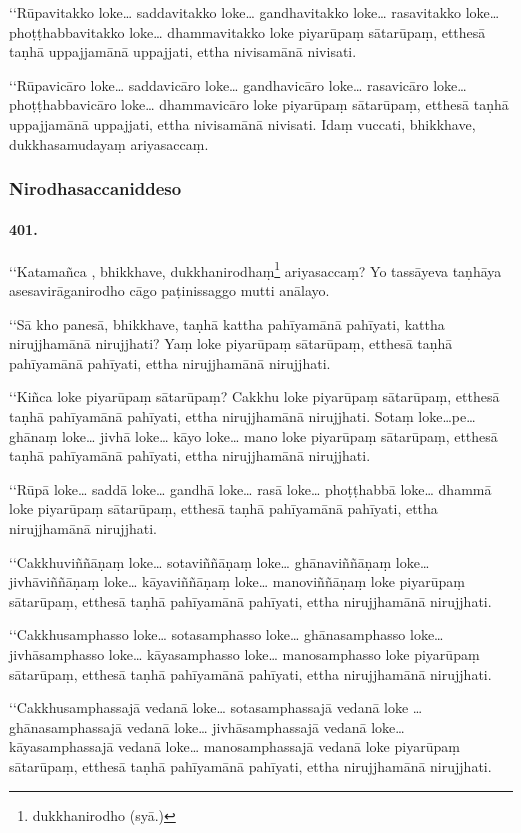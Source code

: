 ‘‘Rūpavitakko loke… saddavitakko loke… gandhavitakko loke… rasavitakko loke… phoṭṭhabbavitakko loke… dhammavitakko loke piyarūpaṃ sātarūpaṃ, etthesā taṇhā uppajjamānā uppajjati, ettha nivisamānā nivisati.

‘‘Rūpavicāro loke… saddavicāro loke… gandhavicāro loke… rasavicāro loke… phoṭṭhabbavicāro loke… dhammavicāro loke piyarūpaṃ sātarūpaṃ, etthesā taṇhā uppajjamānā uppajjati, ettha nivisamānā nivisati. Idaṃ vuccati, bhikkhave, dukkhasamudayaṃ ariyasaccaṃ.

\subsubsection{Nirodhasaccaniddeso}

\paragraph{401.} ‘‘Katamañca , bhikkhave, dukkhanirodhaṃ\footnote{dukkhanirodho (syā.)} ariyasaccaṃ? Yo tassāyeva taṇhāya asesavirāganirodho cāgo paṭinissaggo mutti anālayo.

‘‘Sā kho panesā, bhikkhave, taṇhā kattha pahīyamānā pahīyati, kattha nirujjhamānā nirujjhati? Yaṃ loke piyarūpaṃ sātarūpaṃ, etthesā taṇhā pahīyamānā pahīyati, ettha nirujjhamānā nirujjhati.

‘‘Kiñca loke piyarūpaṃ sātarūpaṃ? Cakkhu loke piyarūpaṃ sātarūpaṃ, etthesā taṇhā pahīyamānā pahīyati, ettha nirujjhamānā nirujjhati. Sotaṃ loke…pe… ghānaṃ loke… jivhā loke… kāyo loke… mano loke piyarūpaṃ sātarūpaṃ, etthesā taṇhā pahīyamānā pahīyati, ettha nirujjhamānā nirujjhati.

‘‘Rūpā loke… saddā loke… gandhā loke… rasā loke… phoṭṭhabbā loke… dhammā loke piyarūpaṃ sātarūpaṃ, etthesā taṇhā pahīyamānā pahīyati, ettha nirujjhamānā nirujjhati.

‘‘Cakkhuviññāṇaṃ loke… sotaviññāṇaṃ loke… ghānaviññāṇaṃ loke… jivhāviññāṇaṃ loke… kāyaviññāṇaṃ loke… manoviññāṇaṃ loke piyarūpaṃ sātarūpaṃ, etthesā taṇhā pahīyamānā pahīyati, ettha nirujjhamānā nirujjhati.

‘‘Cakkhusamphasso loke… sotasamphasso loke… ghānasamphasso loke… jivhāsamphasso loke… kāyasamphasso loke… manosamphasso loke piyarūpaṃ sātarūpaṃ, etthesā taṇhā pahīyamānā pahīyati, ettha nirujjhamānā nirujjhati.

‘‘Cakkhusamphassajā vedanā loke… sotasamphassajā vedanā loke … ghānasamphassajā vedanā loke… jivhāsamphassajā vedanā loke… kāyasamphassajā vedanā loke… manosamphassajā vedanā loke piyarūpaṃ sātarūpaṃ, etthesā taṇhā pahīyamānā pahīyati, ettha nirujjhamānā nirujjhati.

